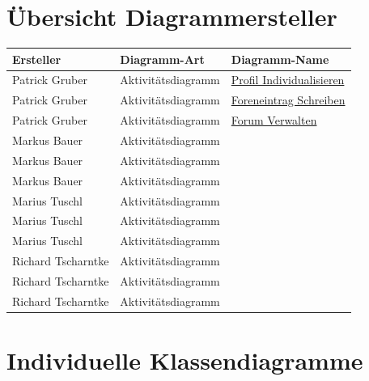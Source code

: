 \documentclass[DIV=13, 10pt,a4paper]{scrartcl}
\newcommand{\colorcell}[1]{\cellcolor{namecolor}\color{white}\textbf{#1}}
\begin{document}
\begin{appendices}
	\section{Übersicht Diagrammersteller}
	\label{app:B_DiagrammUebersicht}
	\begin{tabularx}{\linewidth}{|X|X|X|}
		\hline
		\colorcell{Ersteller} & \colorcell{Diagramm-Art} & \colorcell{Diagramm-Name}\\
		\hline
		Patrick Gruber&Aktivitätsdiagramm&\hyperref[fig:ActDia_Profil_Individualisieren]{Profil Individualisieren}\\
		\hline
		Patrick Gruber&Aktivitätsdiagramm&\hyperref[fig:ActDia_Foreneinntrag_Schreiben]{Foreneintrag Schreiben}\\
		\hline
		Patrick Gruber&Aktivitätsdiagramm&\hyperref[fig:ActDia_Forum_Verwalten]{Forum Verwalten}\\
		\hline
		\hline
		Markus Bauer&Aktivitätsdiagramm& \\
		\hline
		Markus Bauer&Aktivitätsdiagramm& \\
		\hline
		Markus Bauer&Aktivitätsdiagramm& \\
		\hline
		\hline
		Marius Tuschl&Aktivitätsdiagramm& \\
		\hline
		Marius Tuschl&Aktivitätsdiagramm& \\
		\hline
		Marius Tuschl&Aktivitätsdiagramm& \\
		\hline
		\hline
		Richard Tscharntke&Aktivitätsdiagramm& \\
		\hline
		Richard Tscharntke&Aktivitätsdiagramm& \\
		\hline
		Richard Tscharntke&Aktivitätsdiagramm& \\
		\hline
	\end{tabularx}

	\section{Individuelle Klassendiagramme}
	\label{app:C_Klassendiagramme}
	
	
\end{appendices}
\end{document}
